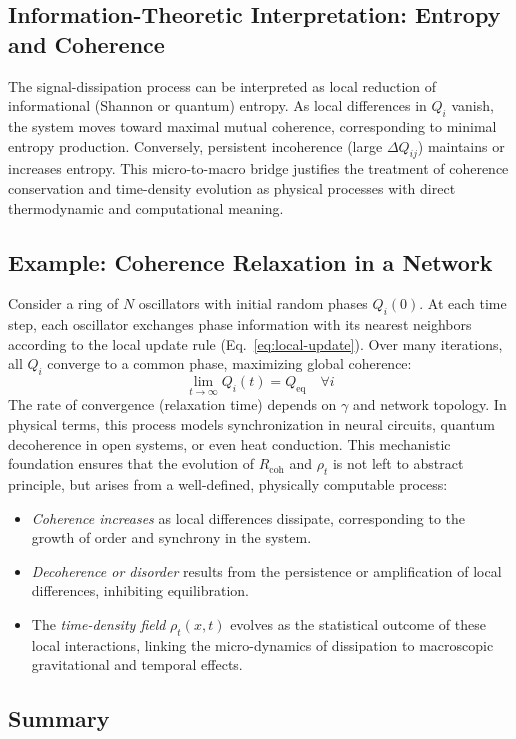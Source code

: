 \subsection{Information-Theoretic Interpretation: Entropy and Coherence}

The signal-dissipation process can be interpreted as local reduction of informational (Shannon or quantum) entropy.
As local differences in $Q_i$ vanish, the system moves toward maximal mutual coherence, corresponding to minimal entropy production.
Conversely, persistent incoherence (large $\Delta Q_{ij}$) maintains or increases entropy.
This micro-to-macro bridge justifies the treatment of coherence conservation and time-density evolution as physical processes with direct thermodynamic and computational meaning.
\subsection{Example: Coherence Relaxation in a Network}

Consider a ring of $N$ oscillators with initial random phases $Q_i(0)$.
At each time step, each oscillator exchanges phase information with its nearest neighbors according to the local update rule (Eq.~\ref{eq:local-update}).
Over many iterations, all $Q_i$ converge to a common phase, maximizing global coherence:
\[
\lim_{t \to \infty} Q_i(t) = Q_{\mathrm{eq}} \quad \forall i
\]
The rate of convergence (relaxation time) depends on $\gamma$ and network topology.
In physical terms, this process models synchronization in neural circuits, quantum decoherence in open systems, or even heat conduction.
This mechanistic foundation ensures that the evolution of $R_{\mathrm{coh}}$ and $\rho_t$ is not left to abstract principle, but arises from a well-defined, physically computable process:
\begin{itemize}
    \item \emph{Coherence increases} as local differences dissipate, corresponding to the growth of order and synchrony in the system.
\item \emph{Decoherence or disorder} results from the persistence or amplification of local differences, inhibiting equilibration.
\item The \emph{time-density field} $\rho_t(x,t)$ evolves as the statistical outcome of these local interactions, linking the micro-dynamics of dissipation to macroscopic gravitational and temporal effects.
\end{itemize}

\subsection{Summary}

